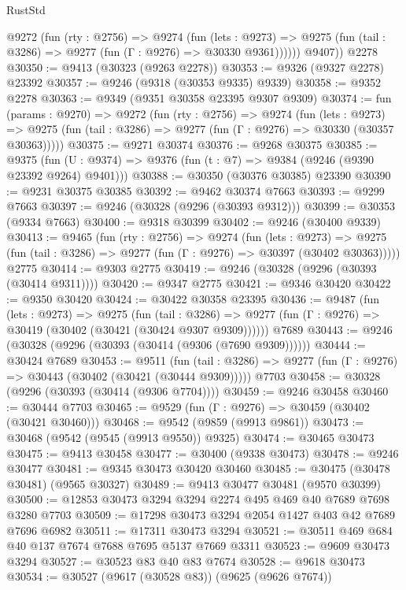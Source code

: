 \begin{lexlean}{RustStd}
\begin{coremodule}
          @9272
            (fun (rty : @2756) =>
            @9274
              (fun (lets : @9273) =>
              @9275 (fun (tail : @3286) => @9277 (fun (Γ : @9276) => @30330 @9361))))))
        @9407))
    @2278
@30350 := @9413 (@30323 (@9263 @2278))
@30353 := @9326 (@9327 @2278) @23392
@30357 := @9246 (@9318 (@30353 @9335) @9339)
@30358 := @9352 @2278
@30363 := @9349 (@9351 @30358 @23395 @9307 @9309)
@30374 := fun (params : @9270) =>
  @9272
    (fun (rty : @2756) =>
    @9274
      (fun (lets : @9273) =>
      @9275 (fun (tail : @3286) => @9277 (fun (Γ : @9276) => @30330 (@30357 @30363)))))
@30375 := @9271 @30374
@30376 := @9268 @30375
@30385 := @9375
    (fun (U : @9374) => @9376 (fun (t : @7) => @9384 (@9246 (@9390 @23392 @9264) @9401)))
@30388 := @30350 (@30376 @30385) @23390
@30390 := @9231 @30375 @30385
@30392 := @9462 @30374 @7663
@30393 := @9299 @7663
@30397 := @9246 (@30328 (@9296 (@30393 @9312)))
@30399 := @30353 (@9334 @7663)
@30400 := @9318 @30399
@30402 := @9246 (@30400 @9339)
@30413 := @9465
    (fun (rty : @2756) =>
    @9274
      (fun (lets : @9273) =>
      @9275 (fun (tail : @3286) => @9277 (fun (Γ : @9276) => @30397 (@30402 @30363)))))
    @2775
@30414 := @9303 @2775
@30419 := @9246 (@30328 (@9296 (@30393 (@30414 @9311))))
@30420 := @9347 @2775
@30421 := @9346 @30420
@30422 := @9350 @30420
@30424 := @30422 @30358 @23395
@30436 := @9487
    (fun (lets : @9273) =>
    @9275
      (fun (tail : @3286) =>
      @9277 (fun (Γ : @9276) => @30419 (@30402 (@30421 (@30424 @9307 @9309))))))
    @7689
@30443 := @9246 (@30328 (@9296 (@30393 (@30414 (@9306 (@7690 @9309))))))
@30444 := @30424 @7689
@30453 := @9511
    (fun (tail : @3286) => @9277 (fun (Γ : @9276) => @30443 (@30402 (@30421 (@30444 @9309)))))
    @7703
@30458 := @30328 (@9296 (@30393 (@30414 (@9306 @7704))))
@30459 := @9246 @30458
@30460 := @30444 @7703
@30465 := @9529 (fun (Γ : @9276) => @30459 (@30402 (@30421 @30460)))
@30468 := @9542 (@9859 (@9913 @9861))
@30473 := @30468 (@9542 (@9545 (@9913 @9550)) @9325)
@30474 := @30465 @30473
@30475 := @9413 @30458
@30477 := @30400 (@9338 @30473)
@30478 := @9246 @30477
@30481 := @9345 @30473 @30420 @30460
@30485 := @30475 (@30478 @30481) (@9565 @30327)
@30489 := @9413 @30477 @30481 (@9570 @30399)
@30500 := @12853 @30473 @3294 @3294 @2274 @495 @469 @40 @7689 @7698 @3280 @7703
@30509 := @17298 @30473 @3294 @2054 @1427 @403 @42 @7689 @7696 @6982
@30511 := @17311 @30473 @3294
@30521 := @30511 @469 @684 @40 @137 @7674 @7688 @7695 @5137 @7669 @3311
@30523 := @9609 @30473 @3294
@30527 := @30523 @83 @40 @83 @7674
@30528 := @9618 @30473
@30534 := @30527 (@9617 (@30528 @83)) (@9625 (@9626 @7674))

\end{coremodule}
\end{lexlean}
